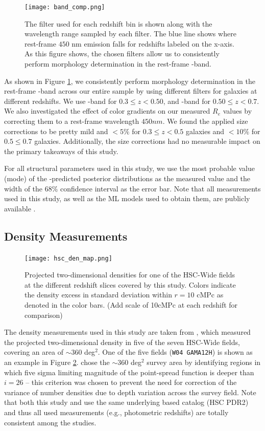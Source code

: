 \begin{figure}[htb]
    \centering
    \texttt{[image: band\_comp.png]}
    \caption{The filter used for each redshift bin is shown along with the wavelength range sampled by each filter. The blue line shows where rest-frame $450$ nm emission falls for redshifts labeled on the x-axis. As this figure shows, the chosen filters allow us to consistently perform morphology determination in the rest-frame \gb{}-band.}
    \label{fig_c4:band_comp}
\end{figure}

As shown in Figure \ref{fig_c4:band_comp}, we consistently perform morphology determination in the rest-frame \gb-band across our entire sample by using  different filters for galaxies at different redshifts. We use \rb-band for $0.3 \leq z < 0.50$, and \ib-band for $0.50 \leq z < 0.7$. We also investigated the effect of color gradients on our measured $R_e$ values by correcting them to a rest-frame wavelength $450nm$. We found the applied size corrections to be pretty mild and $<5\%$ for $0.3 \leq z < 0.5$ galaxies and $<10\%$ for $0.5 \leq 0.7$ galaxies. Additionally, the size corrections had no measurable impact on the primary takeaways of this study. 

For all structural parameters used in this study, we use the most probable value (mode) of the \gampen{}-predicted posterior distributions as the measured value and the width of the $68\%$ confidence interval as the error bar. Note that all measurements used in this study, as well as the ML models used to obtain them, are publicly available \citep{hsc_wide_morphs}.

\subsection{Density Measurements} \label{sec_c4:density_measurements}

\begin{figure}[htb]
    \centering
    \texttt{[image: hsc\_den\_map.png]}
    \caption{Projected two-dimensional densities for one of the HSC-Wide fields at the different redshift slices covered by this study. Colors indicate the density excess in standard deviation within $r=10$ cMPc as denoted in the color bars. (Add scale of 10cMPc at each redshift for comparison)}
    \label{fig_c4:hsc_den_map}
\end{figure}

The density measurements used in this study are taken from \citet{hsc_den}, which measured the projected two-dimensional density in five of the seven HSC-Wide fields, covering an area of $\sim 360$ deg$^2$. One of the five fields (\texttt{W04 GAMA12H}) is shown as an example in Figure \ref{fig_c4:hsc_den_map}. \citet{hsc_den} chose the $\sim 360$ deg$^2$ survey area by identifying regions in which five sigma limiting magnitude of the point-spread function is deeper than $i=26$ -- this criterion was chosen to prevent the need for correction of the variance of number densities due to depth variation across the survey field. Note that both this study and \citet{hsc_den} use the same underlying based catalog (HSC PDR2) and thus all used measurements (e.g., photometric redshifts) are totally consistent among the studies. 

